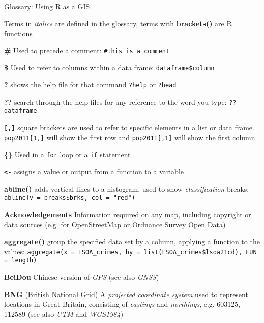 \documentclass[a4paper,10pt]{article}
\begin{document}

\begin{center}

{\huge Glossary: Using R as a GIS}

Terms in \textit{italics} are defined in the glossary, terms with \textbf{brackets()} are R functions

\end{center}

\begin{multicols}{2}

\textbf{\#} Used to precede a comment: \texttt{\#this is a comment}

\textbf{\$} Used to refer to columns within a data frame: \texttt{dataframe\$column} 

\textbf{?} shows the help file for that command \texttt{?help} or \texttt{?head}

\textbf{??} search through the help files for any reference to the word you type: \texttt{??dataframe}

\textbf{\texttt{[,]}} square brackets are used to refer to specific elements in a list or data frame. \texttt{pop2011[1,]} will show the first row and \texttt{pop2011[,1]} will show the first column

\textbf{\{\}} Used in a \texttt{for} loop or a \texttt{if} statement

\textbf{\texttt{<-}} assigns a value or output from a function to a variable

\textbf{abline()} adds vertical lines to a histogram, used to show \textit{classification} breaks: \texttt{abline(v = breaks\$brks, col = "red")}

\textbf{Acknowledgements} Information required on any map, including copyright or data sources  (e.g. for OpenStreetMap or Ordnance Survey Open Data)

\textbf{aggregate()} group the specified data set by a column, applying a function to the values: \texttt{aggregate(x = LSOA\_crimes, by = list(LSOA\_crimes\$lsoa21cd), FUN = length)}

\textbf{BeiDou} Chinese version of \textit{GPS} (see also \textit{GNSS})

\textbf{BNG} (British National Grid) A \textit{projected coordinate system} used to represent locations in Great Britain, consisting of \textit{eastings} and \textit{northings}, e.g. 603125, 112589 (see also \textit{UTM} and \textit{WGS1984}) 


\end{multicols}
\end{document}
